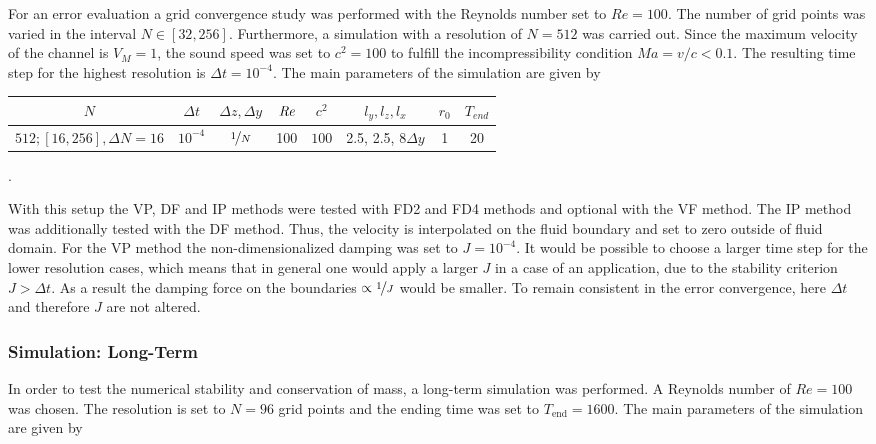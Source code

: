 For an error evaluation a grid convergence study was performed with the Reynolds number set to $Re=100$.
The number of grid points was varied in the interval $N\in[32, 256]$. Furthermore, a
simulation with a resolution of $N=512$ was carried out.
Since the maximum velocity of the channel is $V_{M}=1$,
the sound speed was set to $c^2 = 100$ to fulfill the incompressibility condition $Ma = v/c < 0.1$.
The resulting time step for the highest resolution is $\Delta t = 10^{-4}$.
The main parameters of the simulation are  given by

\begin{center}
\vspace*{0.7ex}
\begin{tabular}{c|c|c|c|c|c|c|c }
 $ N  $                   & $\Delta t$ & $\Delta z, \Delta y$            & $\mbox{\textit{Re}}$  & $c^2$   & $l_y, l_z, l_x$ & $r_0$ & $T_{end}$\\
\hline
 $512; [16, 256], \Delta N = 16 $& $10^{-4}$ & $\nicefrac{1}{N}$ & 100     & $100$   & 2.5, 2.5, $8\Delta y$ & 1     & 20\\
\end{tabular}.
\vspace*{0.7ex}
\end{center}

With this setup the VP, DF and IP methods were tested with FD2 and FD4 methods and optional with the VF method.
The IP method was additionally tested with the DF method. Thus, the velocity is interpolated on the
fluid boundary and set to zero outside of fluid domain.
For the VP method the non-dimensionalized damping was set to $J=10^{-4}$.
It would be possible to choose a larger time step for the lower resolution cases, which means that in general
one would apply a larger $J$ in a case of an application, due to the stability criterion $J>\Delta t$.
As a result the damping force on the boundaries $\propto \nicefrac{1}{J}$ would be smaller.
To remain consistent in the error convergence, here $\Delta t$ and
therefore $J$ are not altered.

\subsubsection{Simulation: Long-Term}

In order to test the  numerical stability and conservation of mass, a long-term simulation was performed.
A Reynolds number of $Re=100$ was chosen. The resolution is set to $N=96$ grid points and
the ending time was set to $T_{\text{end}}=1600$.
The main parameters of the simulation are  given by

